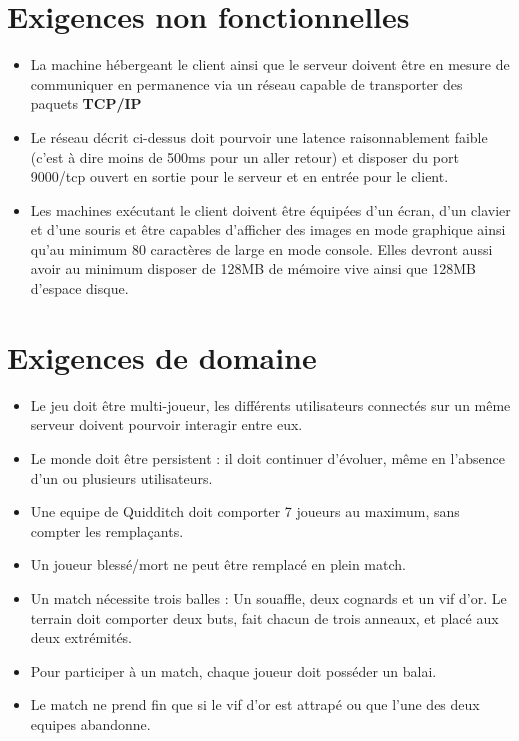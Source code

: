 \documentclass[a4paper]{report}
\begin{document}

\section{Exigences non fonctionnelles}
\begin{itemize}
    \item La machine hébergeant le \gls{client} ainsi que le \gls{serveur} doivent être en mesure de communiquer en permanence via un réseau capable de transporter des paquets \textbf{TCP/IP}
    \item Le réseau décrit ci-dessus doit pourvoir une latence raisonnablement faible (c'est à dire moins de 500ms pour un aller retour) et disposer du port 9000/tcp ouvert en sortie pour le serveur et en entrée pour le client.
    \item Les machines exécutant le \gls{client} doivent être équipées d'un écran, d'un clavier et d'une souris et être capables d'afficher des images en mode graphique ainsi qu'au minimum 80 caractères de large en mode console. Elles devront aussi avoir au minimum disposer de 128MB de mémoire vive ainsi que 128MB d'espace disque.
\end{itemize}


\section{Exigences de domaine}
\begin{itemize}
    \item Le jeu doit être multi-joueur, les différents \glspl{utilisateur} connectés sur un même \gls{serveur} doivent pourvoir interagir entre eux.
    \item Le monde doit être persistent : il doit continuer d'évoluer, même en l'absence d'un ou plusieurs \glspl{utilisateur}.
    \item Une \gls{equipe} de Quidditch doit comporter 7 \glspl{joueur} au maximum, sans compter les remplaçants.
    \item Un \gls{joueur} blessé/mort ne peut être remplacé en plein match.
    \item Un match nécessite trois balles : Un souaffle, deux cognards et un vif d'or. Le terrain doit comporter deux buts, fait chacun de trois anneaux, et placé aux deux extrémités.
    \item Pour participer à un match, chaque \gls{joueur} doit posséder un balai.
    \item Le match ne prend fin que si le vif d'or est attrapé ou que l'une des deux \glspl{equipe} abandonne.

\end{itemize}
\end{document}
